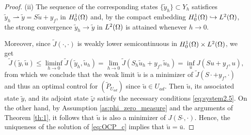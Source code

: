 \begin{proof}
(ii) The sequence of the corresponding states $\{ \tilde y_h \} \subset Y_h$ satisfices $\tilde y_h \rightharpoonup \tilde y = S \tilde u +y_f$, in $H_0^1(\Omega)$ and, by the compact embedding $H_0^1(\Omega) \hookrightarrow L^2(\Omega )$, the strong convergence  $\tilde y_h \to \tilde y$ in  $L^2(\Omega)$ is attained whenever $h\to 0$. %

Moreover, since $\tilde J(\cdot,\cdot)$ is weakly lower semicontinuous in $H_0^1(\Omega) \times L^2(\Omega)$, we get
 $$\tilde J(\tilde y, \tilde u) \leq\liminf_{h\to 0}  \tilde J (\tilde y_h, \tilde u_h) =\lim_{h\to 0}  \tilde J( S_h \tilde u_h +y_f, \tilde u_h)  =\inf_u J(Su+y_f,u), $$
 from which we conclude that the weak limit $\tilde u$ is a minimizer of $\tilde J(S\cdot+y_f,\cdot )$ and thus an optimal control for $(\tilde P_{U_{ad}})$ since $\tilde u \in U_{ad}$. Then $\tilde u$, its associated state $\tilde y$, and its adjoint state $\tilde\varphi$ satisfy the necessary conditions \eqref{eq:system2.5}. On the other hand, by Assumption \ref{as:phi_zero_measure} and the arguments of Theorem \ref{th:1}, it follows that $\tilde u$ is also a minimizer of $ J(S \cdot,\cdot)$. Hence, the uniqueness of the solution of \eqref{eq:OCP_c} implies that $\tilde u=\bar u$.



\end{proof}
